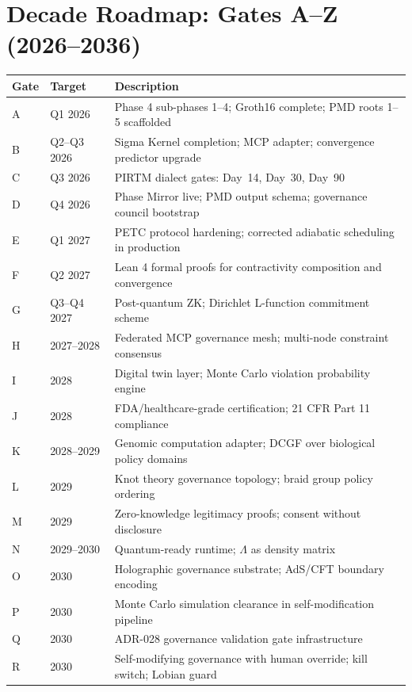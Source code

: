 \documentclass[11pt,letterpaper]{article}
\theoremstyle{remark}
\begin{document}
\section{Decade Roadmap: Gates A--Z (2026--2036)}

\begin{longtable}{llp{8.5cm}}
\toprule
\textbf{Gate} & \textbf{Target} & \textbf{Description} \\
\midrule
\endhead
A & Q1 2026 & Phase 4 sub-phases 1--4; Groth16 complete; PMD roots 1--5 scaffolded \\
B & Q2--Q3 2026 & Sigma Kernel completion; MCP adapter; convergence predictor upgrade \\
C & Q3 2026 & PIRTM dialect gates: Day~14, Day~30, Day~90 \\
D & Q4 2026 & Phase Mirror live; PMD output schema; governance council bootstrap \\
E & Q1 2027 & PETC protocol hardening; corrected adiabatic scheduling in production \\
F & Q2 2027 & Lean 4 formal proofs for contractivity composition and convergence \\
G & Q3--Q4 2027 & Post-quantum ZK; Dirichlet L-function commitment scheme \\
H & 2027--2028 & Federated MCP governance mesh; multi-node constraint consensus \\
I & 2028 & Digital twin layer; Monte Carlo violation probability engine \\
J & 2028 & FDA/healthcare-grade certification; 21 CFR Part 11 compliance \\
K & 2028--2029 & Genomic computation adapter; DCGF over biological policy domains \\
L & 2029 & Knot theory governance topology; braid group policy ordering \\
M & 2029 & Zero-knowledge legitimacy proofs; consent without disclosure \\
N & 2029--2030 & Quantum-ready runtime; $\Lambda$ as density matrix \\
O & 2030 & Holographic governance substrate; AdS/CFT boundary encoding \\
P & 2030 & Monte Carlo simulation clearance in self-modification pipeline \\
Q & 2030 & ADR-028 governance validation gate infrastructure \\
R & 2030 & Self-modifying governance with human override; kill switch; Lobian guard \\

\end{longtable}
\end{document}
